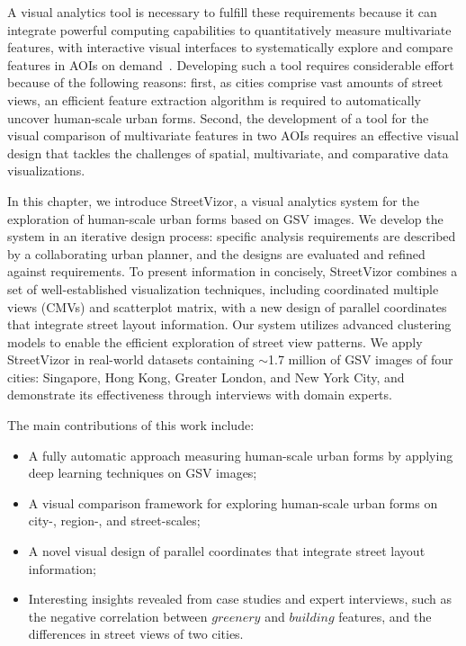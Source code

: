 A visual analytics tool is necessary to fulfill these requirements because it can integrate powerful computing capabilities to quantitatively measure multivariate features, with interactive visual interfaces to systematically explore and compare features in AOIs on demand~\cite{sun_2013_survey}.
Developing such a tool requires considerable effort because of the following reasons:
first, as cities comprise vast amounts of street views, an efficient feature extraction algorithm is required to automatically uncover human-scale urban forms.
Second, the development of a tool for the visual comparison of multivariate features in two AOIs requires an effective visual design that tackles the challenges of spatial, multivariate, and comparative data visualizations.

In this chapter, we introduce StreetVizor, a visual analytics system for the exploration of human-scale urban forms based on GSV images.
We develop the system in an iterative design process: specific analysis requirements are described by a collaborating urban planner, and the designs are evaluated and refined against requirements.  
To present information in concisely, StreetVizor combines a set of well-established visualization techniques, including coordinated multiple views (CMVs) and scatterplot matrix, with a new design of parallel coordinates that integrate street layout information.
Our system utilizes advanced clustering models to enable the efficient exploration of street view patterns.
We apply StreetVizor in real-world datasets containing $\sim$1.7 million of GSV images of four cities: Singapore, Hong Kong, Greater London, and New York City, and demonstrate its effectiveness through interviews with domain experts. 

\vspace*{2mm}
The main contributions of this work include:

\begin{itemize}
	
\vspace*{-1.5mm}
\item
A fully automatic approach measuring human-scale urban forms by applying deep learning techniques on GSV images;
	
\vspace*{-1.5mm}
\item
A visual comparison framework for exploring human-scale urban forms on city-, region-, and street-scales;
	
\vspace*{-1.5mm}
\item
A novel visual design of parallel coordinates that integrate street layout information;
	
\vspace*{-1.5mm}
\item
Interesting insights revealed from case studies and expert interviews, such as the negative correlation between $greenery$ and $building$ features, and the differences in street views of two cities.
		
\end{itemize}